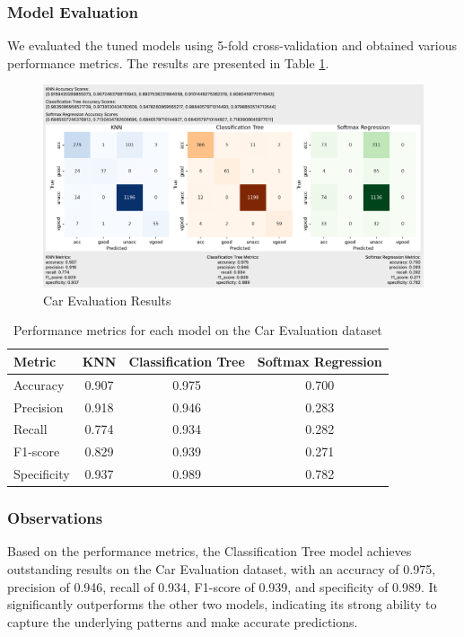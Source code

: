\documentclass[letterpaper,10pt]{article}
\begin{document}
\subsubsection{Model Evaluation}

We evaluated the tuned models using 5-fold cross-validation and obtained various performance metrics. The results are presented in Table \ref{tab:car_metrics}.

\begin{figure}[ht]
    \centering
    \includegraphics[width=1.0\textwidth]{car_eval_results.png}
    \caption{Car Evaluation Results}
    \label{car_eval_results}
\end{figure}

\begin{table}[ht]
\centering
\caption{Performance metrics for each model on the Car Evaluation dataset}
\label{tab:car_metrics}
\begin{tabular}{|l|c|c|c|}
\hline
\textbf{Metric} & \textbf{KNN} & \textbf{Classification Tree} & \textbf{Softmax Regression} \\
\hline
Accuracy & 0.907 & 0.975 & 0.700 \\
\hline
Precision & 0.918 & 0.946 & 0.283 \\
\hline
Recall & 0.774 & 0.934 & 0.282 \\
\hline
F1-score & 0.829 & 0.939 & 0.271 \\
\hline
Specificity & 0.937 & 0.989 & 0.782 \\
\hline
\end{tabular}
\end{table}


\subsubsection{Observations}

Based on the performance metrics, the Classification Tree model achieves outstanding results on the Car Evaluation dataset, with an accuracy of 0.975, precision of 0.946, recall of 0.934, F1-score of 0.939, and specificity of 0.989. It significantly outperforms the other two models, indicating its strong ability to capture the underlying patterns and make accurate predictions.
\end{document}
